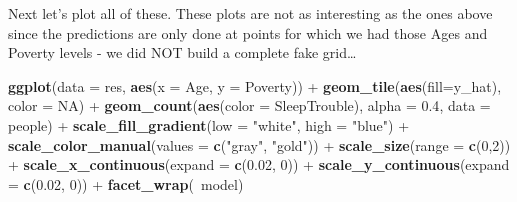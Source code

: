 \documentclass[]{article}
\newenvironment{Shaded}{\begin{snugshade}}{\end{snugshade}}
\newcommand{\KeywordTok}[1]{\textcolor[rgb]{0.13,0.29,0.53}{\textbf{{#1}}}}
\newcommand{\DataTypeTok}[1]{\textcolor[rgb]{0.13,0.29,0.53}{{#1}}}
\newcommand{\DecValTok}[1]{\textcolor[rgb]{0.00,0.00,0.81}{{#1}}}
\newcommand{\FloatTok}[1]{\textcolor[rgb]{0.00,0.00,0.81}{{#1}}}
\newcommand{\StringTok}[1]{\textcolor[rgb]{0.31,0.60,0.02}{{#1}}}
\newcommand{\CommentTok}[1]{\textcolor[rgb]{0.56,0.35,0.01}{\textit{{#1}}}}
\newcommand{\OtherTok}[1]{\textcolor[rgb]{0.56,0.35,0.01}{{#1}}}
\newcommand{\NormalTok}[1]{{#1}}
\begin{document}
\begin{Shaded}
\end{Shaded}

Next let's plot all of these. These plots are not as interesting as the
ones above since the predictions are only done at points for which we
had those Ages and Poverty levels - we did NOT build a complete fake
grid\ldots{}

\begin{Shaded}
\begin{Highlighting}[]
\KeywordTok{ggplot}\NormalTok{(}\DataTypeTok{data =} \NormalTok{res, }\KeywordTok{aes}\NormalTok{(}\DataTypeTok{x =} \NormalTok{Age, }\DataTypeTok{y =} \NormalTok{Poverty)) +}
\StringTok{  }\KeywordTok{geom_tile}\NormalTok{(}\KeywordTok{aes}\NormalTok{(}\DataTypeTok{fill=}\NormalTok{y_hat), }\DataTypeTok{color =} \OtherTok{NA}\NormalTok{) +}
\StringTok{  }\KeywordTok{geom_count}\NormalTok{(}\KeywordTok{aes}\NormalTok{(}\DataTypeTok{color =} \NormalTok{SleepTrouble), }\DataTypeTok{alpha =} \FloatTok{0.4}\NormalTok{, }\DataTypeTok{data =} \NormalTok{people) +}
\StringTok{  }\KeywordTok{scale_fill_gradient}\NormalTok{(}\DataTypeTok{low =} \StringTok{"white"}\NormalTok{, }\DataTypeTok{high =} \StringTok{"blue"}\NormalTok{) +}
\StringTok{  }\KeywordTok{scale_color_manual}\NormalTok{(}\DataTypeTok{values =} \KeywordTok{c}\NormalTok{(}\StringTok{"gray"}\NormalTok{, }\StringTok{"gold"}\NormalTok{)) +}
\StringTok{  }\KeywordTok{scale_size}\NormalTok{(}\DataTypeTok{range =} \KeywordTok{c}\NormalTok{(}\DecValTok{0}\NormalTok{,}\DecValTok{2}\NormalTok{)) +}
\StringTok{  }\KeywordTok{scale_x_continuous}\NormalTok{(}\DataTypeTok{expand =} \KeywordTok{c}\NormalTok{(}\FloatTok{0.02}\NormalTok{, }\DecValTok{0}\NormalTok{)) +}
\StringTok{  }\KeywordTok{scale_y_continuous}\NormalTok{(}\DataTypeTok{expand =} \KeywordTok{c}\NormalTok{(}\FloatTok{0.02}\NormalTok{, }\DecValTok{0}\NormalTok{)) +}
\StringTok{  }\KeywordTok{facet_wrap}\NormalTok{(~model)}
\end{Highlighting}
\end{Shaded}
\end{document}
